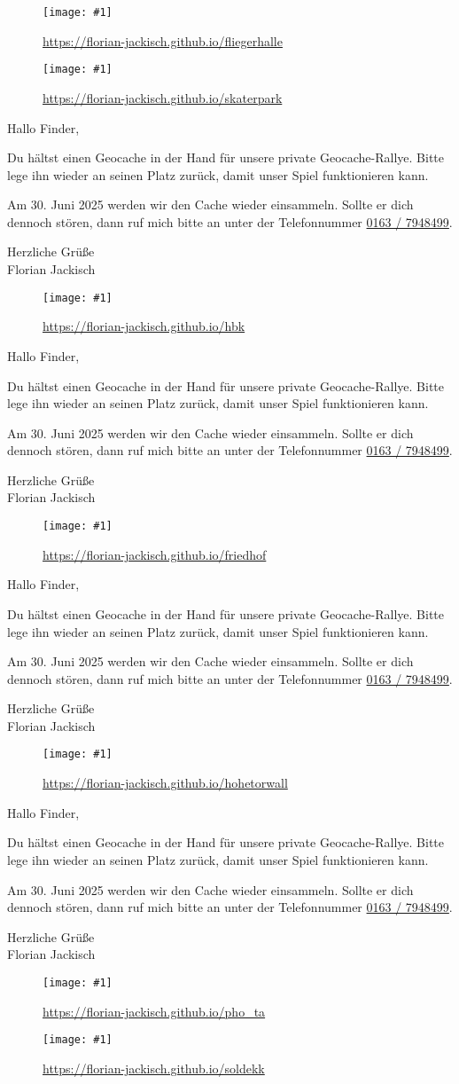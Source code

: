 \documentclass[a4paper,oneside]{article}
\newcommand{\myQRCodes}[2]{
        \begin{minipage}[t][7cm][b]{7cm}
        \begin{figure}[H]
            \centering
            \texttt{[image: \#1]}
            \caption*{\url{#2}}
        \end{figure}
        \end{minipage}
}
\newcommand{\explanation}{
        \setlength{\skip0}{\parskip}
        \begin{minipage}[t][7cm][c]{7cm}
        \setlength\parskip{\skip0}
Hallo Finder,

Du hältst einen Geocache in der Hand für unsere private Geocache-Rallye.
Bitte lege ihn wieder an seinen Platz zurück, damit unser Spiel funktionieren kann.

Am 30. Juni 2025 werden wir den Cache wieder einsammeln.
Sollte er dich dennoch stören, dann ruf mich bitte an unter der Telefonnummer \href{tel:01637948499}{0163 / 7948499}.

Herzliche Grüße\\
Florian Jackisch
        \end{minipage}
}
\begin{document}

\myQRCodes{fliegerhalle.png}{https://florian-jackisch.github.io/fliegerhalle}

\myQRCodes{skaterpark.png}{https://florian-jackisch.github.io/skaterpark}
\explanation

\myQRCodes{hbk.png}{https://florian-jackisch.github.io/hbk}
\explanation

\myQRCodes{friedhof.png}{https://florian-jackisch.github.io/friedhof}
\explanation

\myQRCodes{hohetorwall.png}{https://florian-jackisch.github.io/hohetorwall}
\explanation

\myQRCodes{pho_ta.png}{https://florian-jackisch.github.io/pho_ta}
\myQRCodes{soldekk.png}{https://florian-jackisch.github.io/soldekk}
\end{document}
